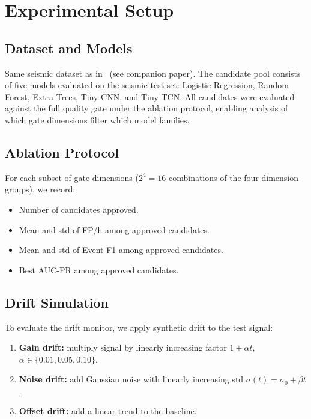 \documentclass[conference]{IEEEtran}
\begin{document}
\section{Experimental Setup}
\label{sec:setup}

\subsection{Dataset and Models}

Same seismic dataset as in~\cite{artigo1} (see companion paper).
The candidate pool consists of five models evaluated on the seismic test set:
Logistic Regression, Random Forest, Extra Trees, Tiny CNN, and Tiny TCN.
All candidates were evaluated against the full quality gate under the ablation
protocol, enabling analysis of which gate dimensions filter which model families.

\subsection{Ablation Protocol}

For each subset of gate dimensions ($2^4 = 16$ combinations of the four
dimension groups), we record:
\begin{itemize}
  \item Number of candidates approved.
  \item Mean and std of FP/h among approved candidates.
  \item Mean and std of Event-F1 among approved candidates.
  \item Best AUC-PR among approved candidates.
\end{itemize}

\subsection{Drift Simulation}

To evaluate the drift monitor, we apply synthetic drift to the test signal:
\begin{enumerate}
  \item \textbf{Gain drift:} multiply signal by linearly increasing factor
        $1 + \alpha t$, $\alpha \in \{0.01, 0.05, 0.10\}$.
  \item \textbf{Noise drift:} add Gaussian noise with linearly increasing
        std $\sigma(t) = \sigma_0 + \beta t$.
  \item \textbf{Offset drift:} add a linear trend to the baseline.
\end{enumerate}
\end{document}

